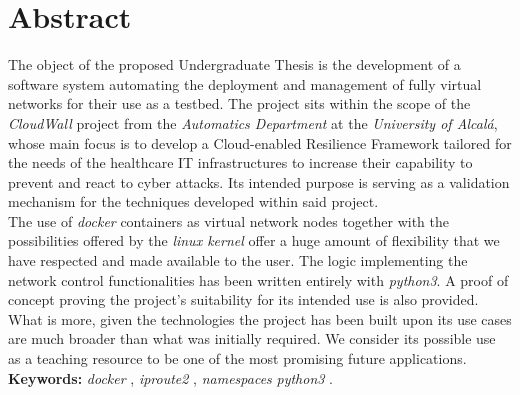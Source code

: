 \chapter{Abstract}
    \thispagestyle{empty}

    The object of the proposed Undergraduate Thesis is the development of a software system automating the deployment and management of fully virtual networks for their use as a testbed. The project sits within the scope of the \textit{CloudWall} \cite{bib:react} project from the \textit{Automatics Department} at the \textit{University of Alcalá}, whose main focus is to develop a Cloud-enabled Resilience Framework tailored for the needs of the healthcare IT infrastructures to increase their capability to prevent and react to cyber attacks. Its intended purpose is serving as a validation mechanism for the techniques developed within said project.\\

    The use of \textit{docker} containers as virtual network nodes together with the possibilities offered by the \textit{linux kernel} offer a huge amount of flexibility that we have respected and made available to the user. The logic implementing the network control functionalities has been written entirely with \textit{python3}. A proof of concept proving the project's suitability for its intended use is also provided. What is more, given the technologies the project has been built upon its use cases are much broader than what was initially required. We consider its possible use as a teaching resource to be one of the most promising future applications.\\

    \textbf{Keywords:} \textit{docker} \cite{bib:docker}, \textit{iproute2} \cite{bib:man-ip}, \textit{namespaces} \cite{bib:man-namespaces} \textit{python3} \cite{bib:python}.
